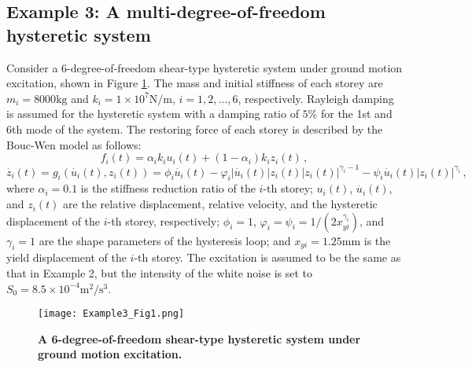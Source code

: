 \documentclass[number,preprint,3p]{elsarticle}
\newcommand{\1}[2]{\mathbb{I}_{#1}\left(#2\right)}
\begin{document}
	\subsection{Example 3: A multi-degree-of-freedom  hysteretic system}\label{Sec:Applicationthree}
	\noindent Consider a 6-degree-of-freedom shear-type  hysteretic system under ground motion excitation, shown in Figure \ref{Fig:Example3_fig1}. The mass and initial stiffness of each storey are $m_{i}=8000\mathrm{kg}$ and $k_{i}=1\times10^7\mathrm{N/m}$, $i=1,2,...,6$, respectively. Rayleigh damping is assumed for the hysteretic system with a damping ratio of $5\%$ for the 1st and 6th mode of the system. The restoring force of each storey is described by the Bouc-Wen model \cite{wen1980equivalent} as follows:	
	\begin{equation}\label{BoucWen1}
		f_{i}(t)=\alpha_{i} k_{i}u_{i}(t)+(1-\alpha_{i})k_{i}z_{i}(t)\,,
	\end{equation}
	\begin{equation}\label{BoucWen2}
		\dot{z_{i}}(t)=g_{i}(\dot{u_{i}}(t),z_{i}(t))=\phi_{i} \dot{u_{i}}(t)-\varphi_{i} \left |\dot{u_{i}}(t)  \right |z_{i}(t)\left |z_{i}(t)  \right |^{\gamma_{i} -1}-\psi_{i}  \dot{u_{i}}(t)\left |z_{i}(t)  \right |^{\gamma_{i} }\,,
	\end{equation}
	where $\alpha_{i}=0.1$ is the stiffness reduction ratio of the $i$-th storey; $u_{i}(t)$, $\dot{u_{i}}(t)$, and $z_{i}(t)$ are the relative displacement, relative velocity, and the hysteretic displacement of the $i$-th storey, respectively; $\phi_{i}=1$, $\varphi_{i}=\psi_{i}=1/(2x_{yi}^{\gamma_{i}})$, and $\gamma_{i}=1$ are the shape parameters of the hysteresis loop; and $x_{yi}=1.25$mm is the yield displacement of the $i$-th storey. The excitation is assumed to be the same as that in Example 2, but the intensity of the white noise is set to $S_0=8.5\times10^{-4} \mathrm{m^2/s^3}$.
	
	\begin{figure}[H]
		\centering
		\texttt{[image: Example3\_Fig1.png]}
		\caption{\textbf{A 6-degree-of-freedom shear-type  hysteretic system under ground motion excitation.} \textit{}}
		\label{Fig:Example3_fig1}
	\end{figure}
\end{document}

